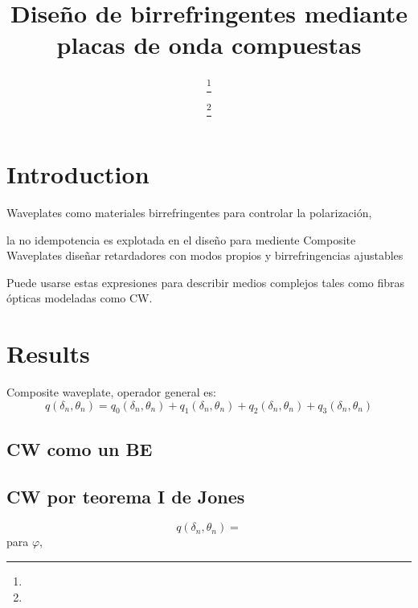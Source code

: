 \documentclass[twocolumn, A4]{webofc}
\begin{document}
%
\title{Diseño de birrefringentes mediante placas de onda compuestas}
%
%

\author{ \fnsep\thanks{} \and {}   \and {}  \and
         \fnsep\thanks{}
}


%
\maketitle
\linenumbers
\section{Introduction}\label{intro} 

Waveplates como materiales birrefringentes para controlar la polarización,

la no idempotencia es explotada en el diseño para mediente Composite Waveplates diseñar retardadores con modos propios y birrefringencias ajustables



Puede usarse estas expresiones para describir medios complejos tales como fibras ópticas modeladas como CW. 
  
\section{Results}\label{EaR}

Composite waveplate, operador general es:
\begin{equation}
q(\delta_n, \theta_n)=q_0(\delta_n, \theta_n)+q_1(\delta_n, \theta_n)+q_2(\delta_n, \theta_n)+q_3(\delta_n, \theta_n)
\end{equation}

\subsection{CW como un BE}

\subsection{CW por teorema I de Jones}
\begin{equation}
q(\delta_n, \theta_n)=
\end{equation}
para $\varphi$,
\end{document}
